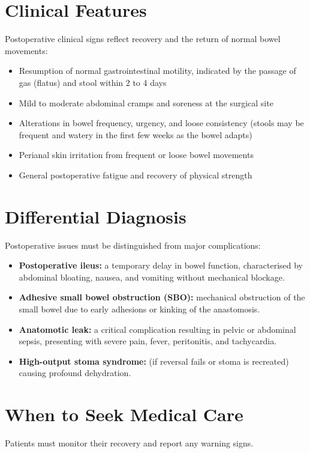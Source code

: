 \section*{Clinical Features}
Postoperative clinical signs reflect recovery and the return of normal bowel movements:

\begin{itemize}
    \item Resumption of normal gastrointestinal motility, indicated by the passage of gas (flatus) and stool within 2 to 4 days
    \item Mild to moderate abdominal cramps and soreness at the surgical site
    \item Alterations in bowel frequency, urgency, and loose consistency (stools may be frequent and watery in the first few weeks as the bowel adapts)
    \item Perianal skin irritation from frequent or loose bowel movements
    \item General postoperative fatigue and recovery of physical strength
\end{itemize}

\section*{Differential Diagnosis}
Postoperative issues must be distinguished from major complications:

\begin{itemize}
    \item \textbf{Postoperative ileus:} a temporary delay in bowel function, characterised by abdominal bloating, nausea, and vomiting without mechanical blockage.
    \item \textbf{Adhesive small bowel obstruction (SBO):} mechanical obstruction of the small bowel due to early adhesions or kinking of the anastomosis.
    \item \textbf{Anatomotic leak:} a critical complication resulting in pelvic or abdominal sepsis, presenting with severe pain, fever, peritonitis, and tachycardia.
    \item \textbf{High-output stoma syndrome:} (if reversal fails or stoma is recreated) causing profound dehydration.
\end{itemize}

\section*{When to Seek Medical Care}
Patients must monitor their recovery and report any warning signs.

